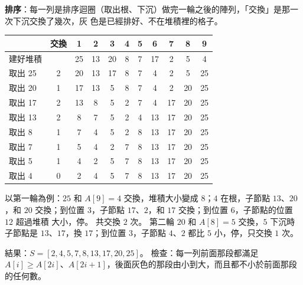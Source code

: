 \begin{pastsoln}
\textbf{排序}：每一列是排序迴圈（取出根、下沉）做完一輪之後的陣列，「交換」是那一次下沉交換了幾次，灰
色是已經排好、不在堆積裡的格子。
\begin{center}
\small
\begin{tabular}{lc*{9}{c}}
\toprule
& 交換 & 1 & 2 & 3 & 4 & 5 & 6 & 7 & 8 & 9 \\
\midrule
建好堆積 & & 25 & 13 & 20 & 8 & 7 & 17 & 2 & 5 & 4 \\
取出 25 & 2 & 20 & 13 & 17 & 8 & 7 & 4 & 2 & 5 & {\color{black!40}25} \\
取出 20 & 1 & 17 & 13 & 5 & 8 & 7 & 4 & 2 & {\color{black!40}20} & {\color{black!40}25} \\
取出 17 & 2 & 13 & 8 & 5 & 2 & 7 & 4 & {\color{black!40}17} & {\color{black!40}20} & {\color{black!40}25} \\
取出 13 & 2 & 8 & 7 & 5 & 2 & 4 & {\color{black!40}13} & {\color{black!40}17} & {\color{black!40}20} & {\color{black!40}25} \\
取出 8 & 1 & 7 & 4 & 5 & 2 & {\color{black!40}8} & {\color{black!40}13} & {\color{black!40}17} & {\color{black!40}20} & {\color{black!40}25} \\
取出 7 & 1 & 5 & 4 & 2 & {\color{black!40}7} & {\color{black!40}8} & {\color{black!40}13} & {\color{black!40}17} & {\color{black!40}20} & {\color{black!40}25} \\
取出 5 & 1 & 4 & 2 & {\color{black!40}5} & {\color{black!40}7} & {\color{black!40}8} & {\color{black!40}13} & {\color{black!40}17} & {\color{black!40}20} & {\color{black!40}25} \\
取出 4 & 0 & 2 & {\color{black!40}4} & {\color{black!40}5} & {\color{black!40}7} & {\color{black!40}8} & {\color{black!40}13} & {\color{black!40}17} & {\color{black!40}20} & {\color{black!40}25} \\
\bottomrule
\end{tabular}
\end{center}
以第一輪為例：$25$ 和 $A[9] = 4$ 交換，堆積大小變成 $8$；$4$ 在根，子節點 $13$、$20$，和
$20$ 交換；到位置 3，子節點 $17$、$2$，和 $17$ 交換；到位置 6，子節點的位置 $12$ 超過堆積
大小，停。 共交換 $2$ 次。 第二輪 $20$ 和 $A[8] = 5$ 交換，$5$ 下沉時子節點是 $13$、$17$，換
$17$；到位置 3，子節點 $4$、$2$ 都比 $5$ 小，停，只交換 $1$ 次。

結果：$S = [2, 4, 5, 7, 8, 13, 17, 20, 25]$。 檢查：每一列前面那段都滿足
$A[i] \ge A[2i]$、$A[2i + 1]$，後面灰色的那段由小到大，而且都不小於前面那段的任何數。
\end{pastsoln}
